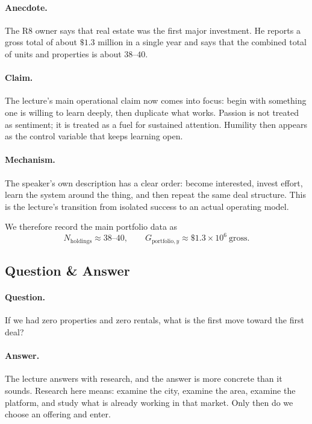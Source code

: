 \paragraph{Anecdote.}
The R8 owner says that real estate was the first major investment. He reports a gross total of about \(\$1.3\) million in a single year and says that the combined total of units and properties is about \(38\text{--}40\).

\paragraph{Claim.}
The lecture's main operational claim now comes into focus: begin with something one is willing to learn deeply, then duplicate what works. Passion is not treated as sentiment; it is treated as a fuel for sustained attention. Humility then appears as the control variable that keeps learning open.

\paragraph{Mechanism.}
The speaker's own description has a clear order: become interested, invest effort, learn the system around the thing, and then repeat the same deal structure. This is the lecture's transition from isolated success to an actual operating model.

We therefore record the main portfolio data as
\begin{equation}
N_{\mathrm{holdings}} \approx 38\text{--}40,
\qquad
G_{\mathrm{portfolio},y} \approx \$1.3\times 10^6 \ \text{gross}.
\end{equation}

\subsection{Question \& Answer}

\paragraph{Question.}
If we had zero properties and zero rentals, what is the first move toward the first deal?

\paragraph{Answer.}
The lecture answers with research, and the answer is more concrete than it sounds. Research here means: examine the city, examine the area, examine the platform, and study what is already working in that market. Only then do we choose an offering and enter.

